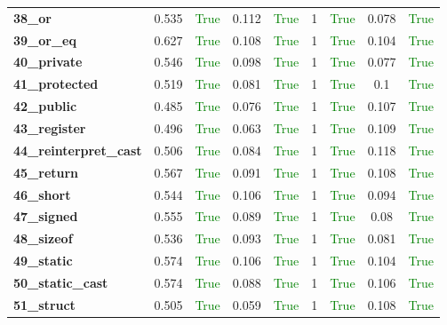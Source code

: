 \documentclass{article}
\begin{document}
\begin{xltabular}{\textwidth}{lcccccccc}
\textbf{38\_or}& 0.535&\textcolor{green}{True}& 0.112&\textcolor{green}{True}& 1&\textcolor{green}{True}& 0.078&\textcolor{green}{True} \\[0.5ex]
\textbf{39\_or\_eq}& 0.627&\textcolor{green}{True}& 0.108&\textcolor{green}{True}& 1&\textcolor{green}{True}& 0.104&\textcolor{green}{True} \\[0.5ex]
\textbf{40\_private}& 0.546&\textcolor{green}{True}& 0.098&\textcolor{green}{True}& 1&\textcolor{green}{True}& 0.077&\textcolor{green}{True} \\[0.5ex]
\textbf{41\_protected}& 0.519&\textcolor{green}{True}& 0.081&\textcolor{green}{True}& 1&\textcolor{green}{True}& 0.1&\textcolor{green}{True} \\[0.5ex]
\textbf{42\_public}& 0.485&\textcolor{green}{True}& 0.076&\textcolor{green}{True}& 1&\textcolor{green}{True}& 0.107&\textcolor{green}{True} \\[0.5ex]
\textbf{43\_register}& 0.496&\textcolor{green}{True}& 0.063&\textcolor{green}{True}& 1&\textcolor{green}{True}& 0.109&\textcolor{green}{True} \\[0.5ex]
\textbf{44\_reinterpret\_cast}& 0.506&\textcolor{green}{True}& 0.084&\textcolor{green}{True}& 1&\textcolor{green}{True}& 0.118&\textcolor{green}{True} \\[0.5ex]
\textbf{45\_return}& 0.567&\textcolor{green}{True}& 0.091&\textcolor{green}{True}& 1&\textcolor{green}{True}& 0.108&\textcolor{green}{True} \\[0.5ex]
\textbf{46\_short}& 0.544&\textcolor{green}{True}& 0.106&\textcolor{green}{True}& 1&\textcolor{green}{True}& 0.094&\textcolor{green}{True} \\[0.5ex]
\textbf{47\_signed}& 0.555&\textcolor{green}{True}& 0.089&\textcolor{green}{True}& 1&\textcolor{green}{True}& 0.08&\textcolor{green}{True} \\[0.5ex]
\textbf{48\_sizeof}& 0.536&\textcolor{green}{True}& 0.093&\textcolor{green}{True}& 1&\textcolor{green}{True}& 0.081&\textcolor{green}{True} \\[0.5ex]
\textbf{49\_static}& 0.574&\textcolor{green}{True}& 0.106&\textcolor{green}{True}& 1&\textcolor{green}{True}& 0.104&\textcolor{green}{True} \\[0.5ex]
\textbf{50\_static\_cast}& 0.574&\textcolor{green}{True}& 0.088&\textcolor{green}{True}& 1&\textcolor{green}{True}& 0.106&\textcolor{green}{True} \\[0.5ex]
\textbf{51\_struct}& 0.505&\textcolor{green}{True}& 0.059&\textcolor{green}{True}& 1&\textcolor{green}{True}& 0.108&\textcolor{green}{True} \\[0.5ex]

\end{xltabular}
\end{document}
